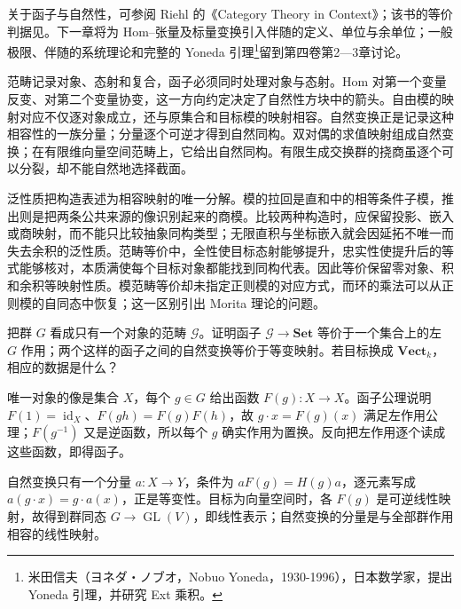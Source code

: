 \ProseParagraphBreak
关于函子与自然性，可参阅 Riehl 的《Category Theory in Context》\cite[Definition 1.3.1, p. 13; Definition 1.4.1, pp. 23--24]{Riehl2016CategoryTheory}；该书的等价判据见\cite[Theorem 1.5.9, pp. 31--32]{Riehl2016CategoryTheory}。下一章将为 Hom–张量及标量变换引入伴随的定义、单位与余单位；一般极限、伴随的系统理论和完整的 Yoneda 引理\footnote{米田信夫（ヨネダ・ノブオ，Nobuo Yoneda，1930-1996），日本数学家，提出 Yoneda 引理，并研究 Ext 乘积。}留到第四卷第2—3章讨论。






\begin{chaptersummary}
	范畴记录对象、态射和复合，函子必须同时处理对象与态射。Hom 对第一个变量反变、对第二个变量协变，这一方向约定决定了自然性方块中的箭头。自由模的映射对应不仅逐对象成立，还与原集合和目标模的映射相容。自然变换正是记录这种相容性的一族分量；分量逐个可逆才得到自然同构。双对偶的求值映射组成自然变换；在有限维向量空间范畴上，它给出自然同构。有限生成交换群的挠商虽逐个可以分裂，却不能自然地选择截面。

	\ProseParagraphBreak
	泛性质把构造表述为相容映射的唯一分解。模的拉回是直和中的相等条件子模，推出则是把两条公共来源的像识别起来的商模。比较两种构造时，应保留投影、嵌入或商映射，而不能只比较抽象同构类型；无限直积与坐标嵌入就会因延拓不唯一而失去余积的泛性质。范畴等价中，全性使目标态射能够提升，忠实性使提升后的等式能够核对，本质满使每个目标对象都能找到同构代表。因此等价保留零对象、积和余积等映射性质。模范畴等价却未指定正则模的对应方式，而环的乘法可以从正则模的自同态中恢复；这一区别引出 Morita 理论的问题。
\end{chaptersummary}

\BookExercises

\begin{exercise}\label{b2:ex:05-one-object-actions}
	把群 \(G\) 看成只有一个对象的范畴 \(\mathcal G\)。证明函子 \(\mathcal G\rightarrow\mathbf{Set}\) 等价于一个集合上的左 \(G\) 作用；两个这样的函子之间的自然变换等价于等变映射。若目标换成 \(\mathbf{Vect}_k\)，相应的数据是什么？
\end{exercise}
\begin{solution}
	唯一对象的像是集合 \(X\)，每个 \(g\in G\) 给出函数 \(F(g):X\rightarrow X\)。函子公理说明 \(F(1)=\operatorname{id}_X\)、\(F(gh)=F(g)F(h)\)，故 \(g\cdot x=F(g)(x)\) 满足左作用公理；\(F(g^{-1})\) 又是逆函数，所以每个 \(g\) 确实作用为置换。反向把左作用逐个读成这些函数，即得函子。

	自然变换只有一个分量 \(a:X\rightarrow Y\)，条件为 \(aF(g)=H(g)a\)，逐元素写成 \(a(g\cdot x)=g\cdot a(x)\)，正是等变性。目标为向量空间时，各 \(F(g)\) 是可逆线性映射，故得到群同态 \(G\rightarrow\operatorname{GL}(V)\)，即线性表示；自然变换的分量是与全部群作用相容的线性映射。
\end{solution}

